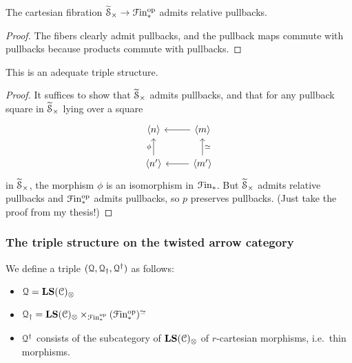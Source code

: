 \documentclass[main.tex]{subfiles}
\begin{document}
\begin{proposition}
  The cartesian fibration $\widetilde{\mathcal{S}}_{\times} \to \mathcal{F}\mathrm{in}_{*}^{\mathrm{op}}$ admits relative pullbacks.
\end{proposition}
\begin{proof}
  The fibers clearly admit pullbacks, and the pullback maps commute with pullbacks because products commute with pullbacks.
\end{proof}

\begin{proposition}
  This is an adequate triple structure.
\end{proposition}
\begin{proof}
  It suffices to show that $\widetilde{\mathcal{S}}_{\times}$ admits pullbacks, and that for any pullback square in $\widetilde{\mathcal{S}}_{\times}$ lying over a square
  \begin{equation*}
    \begin{tikzcd}
      \langle n \rangle
      & \langle m \rangle
      \arrow[l]
      \\
      \langle n' \rangle
      \arrow[u, "\phi"]
      & \langle m' \rangle
      \arrow[l]
      \arrow[u, swap, "\simeq"]
    \end{tikzcd}
  \end{equation*}
  in $\widetilde{\mathcal{S}}_{\times}$, the morphism $\phi$ is an isomorphism in $\mathcal{F}\mathrm{in}_{*}$. But $\widetilde{\mathcal{S}}_{\times}$ admits relative pullbacks and $\mathcal{F}\mathrm{in}_{*}^{\mathrm{op}}$ admits pullbacks, so $p$ preserves pullbacks. (Just take the proof from my thesis!)
\end{proof}

\subsubsection{The triple structure on the twisted arrow category}
\label{sss:the_triple_structure_on_the_twisted_arrow_category}

We define a triple $(\mathcal{Q}, \mathcal{Q}_{\dagger}, \mathcal{Q}^{\dagger})$ as follows:
\begin{itemize}
  \item $\mathcal{Q} = \mathbf{LS}(\mathcal{C})_{\otimes}$

  \item $\mathcal{Q}_{\dagger} = \mathbf{LS}(\mathcal{C})_{\otimes} \times_{\mathcal{F}\mathrm{in}_{*}^{\mathrm{op}}}(\mathcal{F}\mathrm{in}_{*}^{\mathrm{op}})^{\simeq}$

  \item $\mathcal{Q}^{\dagger}$ consists of the subcategory of $\mathbf{LS}(\mathcal{C})_{\otimes}$ of $r$-cartesian morphisms, i.e.\ thin morphisms.
\end{itemize}
\end{document}
